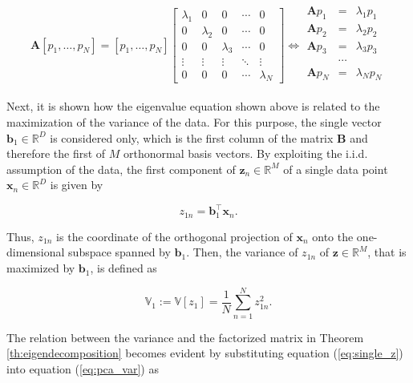 \documentclass[../../../main.tex]{subfiles}
\begin{document}
\begin{equation*}
        \bm{A} [p_1, \dots, p_N] = [p_1, \dots, p_N] \left[\begin{array}{ccccc}
            \lambda_1 & 0 & 0 & \cdots & 0 \\
            0 & \lambda_2 & 0 & \cdots & 0 \\
            0 & 0 & \lambda_3 & \cdots & 0 \\
            \vdots & \vdots & \vdots & \ddots & \vdots \\
            0 & 0 & 0 & \cdots & \lambda_N
        \end{array}\right] \Longleftrightarrow \begin{array}{ccc} 
            \bm{A}p_1 &= &\lambda_1p_1\\
            \bm{A}p_2 &= &\lambda_2p_2\\
            \bm{A}p_3 &= &\lambda_3p_3\\
            & \cdots& \\
            \bm{A}p_N &= &\lambda_Np_N\\
        \end{array}
\end{equation*}

Next, it is shown how the eigenvalue equation shown above is related to the maximization of the variance of the data. For this purpose, the single vector $\bm{b}_1 \in \mathbb{R}^D$ is considered only, which is the first column of the matrix $\bm{B}$ and therefore the first of $M$ orthonormal basis vectors. By exploiting the i.i.d. assumption of the data, the first component of $\bm{z}_n \in \mathbb{R}^M$ of a single data point $\bm{x}_n \in \mathbb{R}^D$ is given by

\begin{equation}\label{eq:single_z}
    z_{1n} = \bm{b}_1^\top\bm{x}_n.
\end{equation}

Thus, $z_{1n}$ is the coordinate of the orthogonal projection of $\bm{x}_n$ onto the one-dimensional subspace spanned by $\bm{b}_1$. Then, the variance of $z_{1n}$ of $\bm{z} \in \mathbb{R}^M$, that is maximized by $\bm{b}_1$, is defined as

\begin{equation}\label{eq:pca_var}
    \mathbb{V}_1:= \mathbb{V}[z_1] = \frac{1}{N}\sum_{n=1}^N z_{1n}^2.
\end{equation}

The relation between the variance and the factorized matrix in Theorem \ref{th:eigendecomposition} becomes evident by substituting equation (\ref{eq:single_z}) into equation (\ref{eq:pca_var}) as
\end{document}
